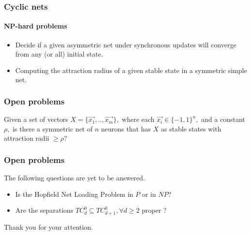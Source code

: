 \documentclass{beamer}
\begin{document}
\begin{frame}
\frametitle{Cyclic nets}
\framesubtitle{NP-hard problems}
\begin{itemize}
	\item Decide if a given asymmetric net under synchronous updates will converge from any (or all) initial state.
	\item Computing the attraction radius of a given stable state in a symmetric simple net.
\end{itemize}
\end{frame}

\begin{frame}
\frametitle{Open problems}
\begin{definition}
	Given a set of vectors $X=\{\vec{x_1}, .., \vec{x_m}\},$ where each $\vec{x_i} \in \{-1,1\}^n,$ and a constant $\rho,$ is there a symmetric net of $n$ neurons that has $X$ as stable states with attraction radii $\geq \rho?$
\end{definition}
\end{frame}

\begin{frame}
	\frametitle{Open problems}
The following questions are yet to be answered.
\begin{itemize}
	\item Is the Hopfield Net Loading Problem in $P$ or in $NP$?
	\item Are the separations $TC_d^0 \subseteq TC_{d+1}^0, \forall d\geq2$ proper ? 
\end{itemize}
\end{frame}
\begin{frame}
\begin{center}
	Thank you for your attention.
\end{center}
\end{frame}
\end{document}
